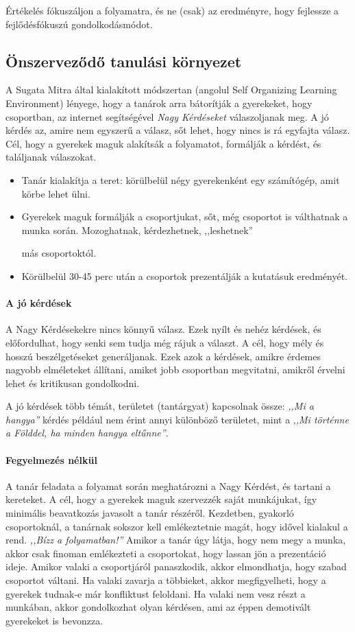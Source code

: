 Értékelés fókuszáljon a folyamatra, és ne (csak)  az eredményre, hogy fejlessze a fejlődésfókuszú gondolkodásmódot.\citep{growthmindset}

\subsection{Önszerveződő tanulási környezet}
A Sugata Mitra által kialakított módszertan (angolul Self Organizing Learning Environment) lényege, hogy a tanárok arra bátorítják a gyerekeket, hogy csoportban, az internet segítségével \emph{Nagy Kérdéseket} válaszoljanak meg. A jó kérdés az, amire nem egyszerű a válasz, sőt lehet, hogy nincs is rá egyfajta válasz. Cél, hogy a gyerekek maguk alakítsák a folyamatot, formálják a kérdést, és találjanak válaszokat.

\begin{itemize}
      \item Tanár kialakítja a teret: körülbelül négy gyerekenként egy számítógép, amit körbe lehet ülni.
      \item Gyerekek maguk formálják a csoportjukat, sőt, még csoportot is válthatnak a munka során. Mozoghatnak, kérdezhetnek, ,,leshetnek''

            más csoportoktól.
      \item Körülbelül 30-45 perc után a csoportok prezentálják a kutatásuk eredményét.
\end{itemize}

\paragraph{A jó kérdések}
A Nagy Kérdésekekre nincs könnyű válasz. Ezek nyílt és nehéz kérdések, és előfordulhat, hogy senki sem tudja még rájuk a választ. A cél, hogy mély és hosszú beszélgetéseket generáljanak. Ezek azok a kérdések, amikre érdemes nagyobb elméleteket állítani, amiket jobb csoportban megvitatni, amikről érvelni lehet és kritikusan gondolkodni.

A jó kérdések több témát, területet (tantárgyat) kapcsolnak össze: \emph{,,Mi a
      hangya''} kérdés például nem érint annyi különböző területet, mint a ,\emph{,Mi
      történne a Földdel, ha minden hangya eltűnne''}.

\paragraph{Fegyelmezés nélkül}
A tanár feladata a folyamat során meghatározni a Nagy Kérdést, és tartani a kereteket. A cél, hogy a gyerekek maguk szervezzék saját munkájukat, így minimális beavatkozás javasolt a tanár részéről. Kezdetben, gyakorló csoportoknál, a tanárnak sokszor kell emlékeztetnie magát, hogy idővel kialakul a rend. \emph{,,Bízz a
      folyamatban!''
} Amikor a tanár úgy látja, hogy nem megy a munka, akkor csak finoman emlékezteti a csoportokat, hogy lassan jön a prezentáció ideje. Amikor valaki a csoportjáról panaszkodik, akkor elmondhatja, hogy szabad csoportot váltani. Ha valaki zavarja a többieket, akkor megfigyelheti, hogy a gyerekek tudnak-e már konfliktust feloldani. Ha valaki nem vesz részt a munkában, akkor gondolkozhat olyan kérdésen, ami az éppen demotivált gyerekeket is bevonzza.

